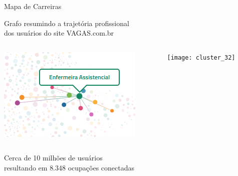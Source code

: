 \documentclass[10pt, hyperref={pdfpagelabels=false}]{beamer}
\begin{document}
{
\begin{frame}[c, label=mapa-de-carreiras]{Mapa de Carreiras}
  \begin{center}
    Grafo resumindo a trajetória profissional\\dos usuários do site VAGAS.com.br
    
    \begin{columns}[onlytextwidth]
      \begin{column}{0.4\textwidth}
        \centering
        \includegraphics[width=\textwidth]{mapa-enfermeira-assistencial}
      \end{column}
      
      \begin{column}{0.6\textwidth}
        \centering
        \texttt{[image: cluster\_32]}
      \end{column}
    \end{columns}

    Cerca de \alert{10 milhões} de usuários\\resultando em \alert{8.348 ocupações} conectadas
  \end{center}
\end{frame}
}
\end{document}
